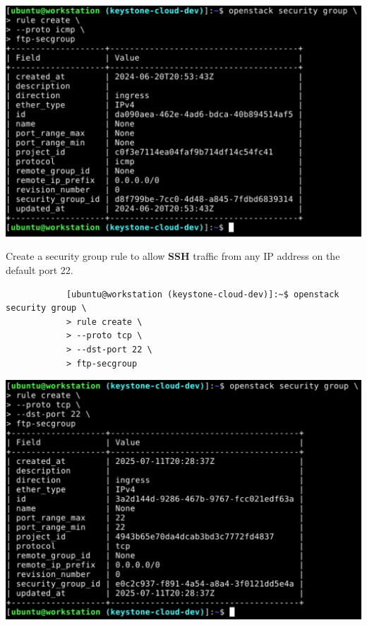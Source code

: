 \documentclass[letterpaper, 12pt]{article}
\begin{document}
\begin{enumerate}
\begin{labstep}
        \begin{center}
            \includegraphics[width=\linewidth]{images/part1/step35.png}
        \end{center}
    \end{labstep}

    \begin{labstep}
        Create a security group rule to allow \textbf{SSH} traffic from any IP address on the default port 22.
        \begin{lstlisting}
            [ubuntu@workstation (keystone-cloud-dev)]:~$ openstack security group \
            > rule create \
            > --proto tcp \
            > --dst-port 22 \
            > ftp-secgroup
        \end{lstlisting}

        \begin{center}
            \includegraphics[width=\linewidth]{images/part1/step36.png}
        \end{center}
    \end{labstep}


\end{enumerate}
\end{document}
